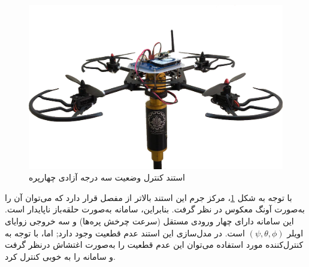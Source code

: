 \begin{figure}[H]
	\includegraphics[width=12cm]{../Figures/introduction/3DOFQuad.png}
	\centering
	\caption{استند کنترل وضعیت سه درجه آزادی چهارپره 
	\cite{Iranlabexpo}}
\label{LabQuad1}
\end{figure}
با توجه به شکل
\ref{LabQuad1}،
مرکز جرم این استند بالاتر از مفصل قرار دارد که می‌توان آن را به‌صورت آونگ معکوس در نظر گرفت. بنابراین، سامانه به‌صورت حلقه‌باز ناپایدار است. این سامانه دارای چهار ورودی مستقل (سرعت چرخش پره‌ها) و سه خروجی زوایای اویلر
$(\psi ,\theta ,\phi)$
است. در مدل‌سازی این استند عدم قطعیت وجود دارد; اما، با توجه به کنترل‌کننده مورد استفاده می‌توان این عدم قطعیت را به‌صورت اغتشاش درنظر گرفت و سامانه را به خوبی کنترل کرد. 


%


